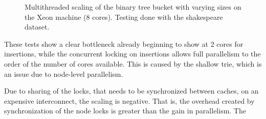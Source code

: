 \begin{landscape}
\begin{figure}[!h]
{        }
        \label{fig:ts_ask_shake_btree}
        \caption{Multithreaded scaling of the binary tree bucket with varying sizes on the
        Xeon machine (8 cores). Testing done with the shakespeare dataset.}
    \end{figure}
\end{landscape}

These tests show a clear bottleneck already beginning to show at 2 cores for insertions, while
the concurrent locking on insertions allows full parallelism to the order of the number of cores
available. This is caused by the shallow trie, which is an issue due to node-level parallelism.

Due to sharing of the locks, that needs to be synchronized between caches, on an expensive
interconnect, the scaling is negative. That is, the overhead created by synchronization of
the node locks is greater than the gain in parallelism. The 



